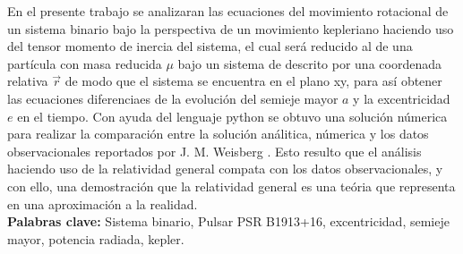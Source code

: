 En el presente trabajo se analizaran las ecuaciones del movimiento rotacional de un sistema binario bajo la perspectiva
de un movimiento kepleriano haciendo uso del tensor momento de inercia del sistema, el cual será reducido al de una partícula
con masa reducida $\mu$ bajo un sistema de descrito por una coordenada relativa $\vec{r}$ de modo que el sistema se encuentra en el plano xy, 
para así obtener las ecuaciones diferenciaes de la evolución del semieje mayor $a$ y la excentricidad $e$ en el tiempo. Con ayuda del lenguaje
python se obtuvo una solución númerica para realizar la comparación entre la solución análitica, númerica y los datos observacionales reportados por 
J. M. Weisberg \cite{Weisberg2010}. Esto resulto que el análisis haciendo uso de la relatividad general compata con los datos observacionales, y con ello, 
una demostración que la relatividad general es una teória que representa en una aproximación a la realidad.\\
\textbf{Palabras clave:} Sistema binario, Pulsar PSR B1913+16, excentricidad, semieje mayor, potencia radiada, kepler.